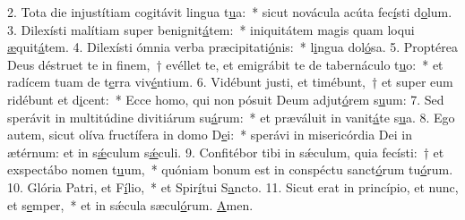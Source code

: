 2. Tota die injustítiam cogitávit lingua t\uline{u}a:~* sicut novácula acúta fec\uline{í}sti d\uline{o}lum.
3. Dilexísti malítiam super benignit\uline{á}tem:~* iniquitátem magis quam loqui \uline{æ}quit\uline{á}tem.
4. Dilexísti ómnia verba præcipitati\uline{ó}nis:~* l\uline{i}ngua dol\uline{ó}sa.
5. Proptérea Deus déstruet te in finem,~† evéllet te, et emigrábit te de tabernáculo t\uline{u}o:~* et radícem tuam de t\uline{e}rra viv\uline{é}ntium.
6. Vidébunt justi, et timébunt,~† et super eum ridébunt et d\uline{i}cent:~* Ecce homo, qui non pósuit Deum adjut\uline{ó}rem s\uline{u}um:
7. Sed sperávit in multitúdine divitiárum su\uline{á}rum:~* et præváluit in vanit\uline{á}te s\uline{u}a.
8. Ego autem, sicut olíva fructífera in domo D\uline{e}i:~* sperávi in misericórdia Dei in ætérnum: et in s\uline{ǽ}culum s\uline{ǽ}culi.
9. Confitébor tibi in sǽculum, quia fecísti:~† et exspectábo nomen t\uline{u}um,~* quóniam bonum est in conspéctu sanct\uline{ó}rum tu\uline{ó}rum.
10. Glória Patri, et F\uline{í}lio,~* et Spir\uline{í}tui S\uline{a}ncto.
11. Sicut erat in princípio, et nunc, et s\uline{e}mper,~* et in sǽcula sæcul\uline{ó}rum. \uline{A}men.

